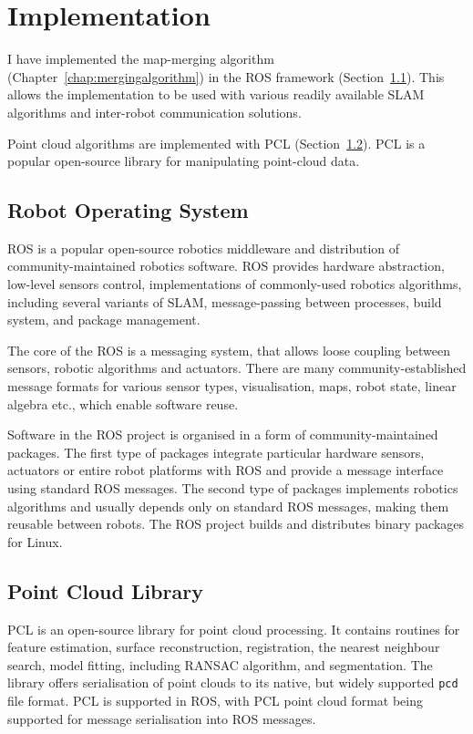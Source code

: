 \chapter{Implementation}
\label{chap:implementation}

I have implemented the map-merging algorithm (Chapter~\ref{chap:mergingalgorithm}) in the \gls{ROS} framework (Section~\ref{sec:ros}). This allows the implementation to be used with various readily available \gls{SLAM} algorithms and inter-robot communication solutions.

Point cloud algorithms are implemented with \gls{PCL} (Section~\ref{sec:pcl}). \gls{PCL} is a popular open-source library for manipulating point-cloud data.

\section{Robot Operating System}
\label{sec:ros}

\gls{ROS} is a popular open-source robotics middleware and distribution of community-maintained robotics software. \gls{ROS} provides hardware abstraction, low-level sensors control, implementations of commonly-used robotics algorithms, including several variants of \gls{SLAM}, message-passing between processes, build system, and package management.

The core of the \gls{ROS} is a messaging system, that allows loose coupling between sensors, robotic algorithms and actuators. There are many community-established message formats for various sensor types, visualisation, maps, robot state, linear algebra etc., which enable software reuse.

Software in the \gls{ROS} project is organised in a form of community-maintained packages. The first type of packages integrate particular hardware sensors, actuators or entire robot platforms with \gls{ROS} and provide a message interface using standard \gls{ROS} messages. The second type of packages implements robotics algorithms and usually depends only on standard \gls{ROS} messages, making them reusable between robots. The \gls{ROS} project builds and distributes binary packages for Linux.

\section{Point Cloud Library}
\label{sec:pcl}

\gls{PCL} is an open-source library for point cloud processing. It contains routines for feature estimation, surface reconstruction, registration, the nearest neighbour search, model fitting, including \gls{RANSAC} algorithm, and segmentation. The library offers serialisation of point clouds to its native, but widely supported \texttt{pcd} file format. \Gls{PCL} is supported in \gls{ROS}, with \gls{PCL} point cloud format being supported for message serialisation into \gls{ROS} messages.

